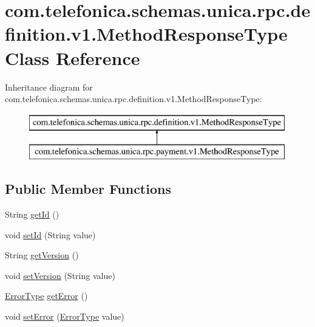 \hypertarget{classcom_1_1telefonica_1_1schemas_1_1unica_1_1rpc_1_1definition_1_1v1_1_1MethodResponseType}{
\section{com.telefonica.schemas.unica.rpc.definition.v1.MethodResponseType Class Reference}
\label{classcom_1_1telefonica_1_1schemas_1_1unica_1_1rpc_1_1definition_1_1v1_1_1MethodResponseType}
}
Inheritance diagram for com.telefonica.schemas.unica.rpc.definition.v1.MethodResponseType:\begin{figure}[H]
\begin{center}
\leavevmode
\includegraphics[height=2.000000cm]{classcom_1_1telefonica_1_1schemas_1_1unica_1_1rpc_1_1definition_1_1v1_1_1MethodResponseType}
\end{center}
\end{figure}
\subsection*{Public Member Functions}
\begin{DoxyCompactItemize}
\item 
String \hyperlink{classcom_1_1telefonica_1_1schemas_1_1unica_1_1rpc_1_1definition_1_1v1_1_1MethodResponseType_a5a78bf663c4b645394d4918abad4be6a}{getId} ()
\item 
void \hyperlink{classcom_1_1telefonica_1_1schemas_1_1unica_1_1rpc_1_1definition_1_1v1_1_1MethodResponseType_af8b56cc6d81c307e01d7f712519a7504}{setId} (String value)
\item 
String \hyperlink{classcom_1_1telefonica_1_1schemas_1_1unica_1_1rpc_1_1definition_1_1v1_1_1MethodResponseType_a39ce69779059d746aa4f0fcf90d098c5}{getVersion} ()
\item 
void \hyperlink{classcom_1_1telefonica_1_1schemas_1_1unica_1_1rpc_1_1definition_1_1v1_1_1MethodResponseType_af189bebd044de1d4e377b30d85eb9093}{setVersion} (String value)
\item 
\hyperlink{classcom_1_1telefonica_1_1schemas_1_1unica_1_1rpc_1_1definition_1_1v1_1_1ErrorType}{ErrorType} \hyperlink{classcom_1_1telefonica_1_1schemas_1_1unica_1_1rpc_1_1definition_1_1v1_1_1MethodResponseType_ad6fae7ed55272b6995299ee073219836}{getError} ()
\item 
void \hyperlink{classcom_1_1telefonica_1_1schemas_1_1unica_1_1rpc_1_1definition_1_1v1_1_1MethodResponseType_a7d6a82268f846b8c203830738943dc40}{setError} (\hyperlink{classcom_1_1telefonica_1_1schemas_1_1unica_1_1rpc_1_1definition_1_1v1_1_1ErrorType}{ErrorType} value)
\end{DoxyCompactItemize}
